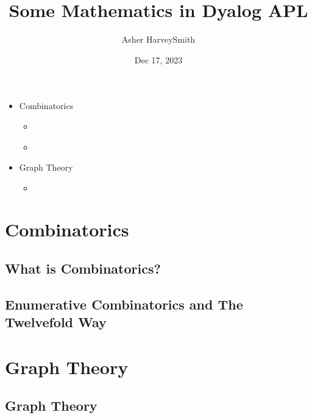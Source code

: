 \documentclass[letterpaper,10pt,english]{jupyterBook}
\title{Some Mathematics in Dyalog APL}
\date{Dec 17, 2023}
\author{Asher Harvey\sphinxhyphen{}Smith}
\begin{document}
\pagestyle{empty}
\sphinxmaketitle
\pagestyle{plain}
\sphinxtableofcontents
\pagestyle{normal}
\label{\detokenize{intro::doc}}

\begin{itemize}
\item {} 
\sphinxAtStartPar
Combinatorics

\begin{itemize}
\item {} 
\sphinxAtStartPar
{\hyperref[\detokenize{combinatorics/combinatorics::doc}]{}}

\item {} 
\sphinxAtStartPar
{\hyperref[\detokenize{combinatorics/enumerative::doc}]{}}

\end{itemize}
\end{itemize}
\begin{itemize}
\item {} 
\sphinxAtStartPar
Graph Theory

\begin{itemize}
\item {} 
\sphinxAtStartPar
{\hyperref[\detokenize{graph-theory/graph-theory::doc}]{}}

\end{itemize}
\end{itemize}

\sphinxstepscope


\part{Combinatorics}

\sphinxstepscope


\chapter{What is Combinatorics?}
\label{\detokenize{combinatorics/combinatorics:what-is-combinatorics}}\label{\detokenize{combinatorics/combinatorics::doc}}
\sphinxstepscope


\chapter{Enumerative Combinatorics and The Twelvefold Way}
\label{\detokenize{combinatorics/enumerative:enumerative-combinatorics-and-the-twelvefold-way}}\label{\detokenize{combinatorics/enumerative::doc}}
\sphinxstepscope


\part{Graph Theory}

\sphinxstepscope


\chapter{Graph Theory}
\label{\detokenize{graph-theory/graph-theory:graph-theory}}\label{\detokenize{graph-theory/graph-theory::doc}}






\renewcommand{\indexname}{Index}
\printindex
\end{document}
